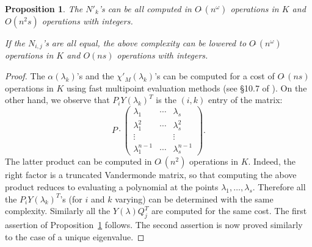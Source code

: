 \documentclass[sigconf]{acmart}
\newcommand{\softO}{O\tilde{~}}
\newtheorem{prop}[theo]{Proposition}
\theoremstyle{definition}
\begin{document}
\begin{prop}
\label{prop:opteigenvalues}
The $N'_k$'s can be all computed in $\softO(n^\omega)$ operations
in $K$ and $O(n^2 s)$ operations with integers.

If the $N_{i,j}$'s are all equal, the above complexity can be 
lowered to $\softO(n^\omega)$ operations in $K$ and $O(n s)$ operations 
with integers.
\end{prop}

\begin{proof}
The $\alpha(\lambda_k)$'s and the $\chi'_M(\lambda_k)$'s can be computed 
for a cost of $\softO(ns)$ operations in $K$ using fast multipoint 
evaluation methods (see \S 10.7 of \cite{gathen-gerhard:13a}).
On the other hand, we observe that $P_i Y(\lambda_k)^T$ is
the $(i,k)$ entry of the matrix:
$$P \cdot \left( \begin{matrix}
\lambda_1 & \cdots & \lambda_s \\
\lambda_1^2 & \cdots & \lambda_s^2 \\
\vdots & & \vdots \\
\lambda_1^{n-1} & \cdots & \lambda_s^{n-1}
\end{matrix} \right).$$
The latter product can be computed in $\softO(n^2)$ operations in 
$K$. Indeed,
the right factor is a truncated Vandermonde matrix, so that
computing the above product reduces to evaluating a polynomial at the
points $\lambda_1, \ldots, \lambda_s$. Therefore all the $P_i 
Y(\lambda_k)^T$'s (for $i$ and $k$ varying) 
can be determined with the same complexity. 
Similarly all the $Y(\lambda) Q_j^T$ are computed for the same cost.
The first assertion of Proposition~\ref{prop:opteigenvalues} follows.
The second assertion is now proved similarly to the case of a unique
eigenvalue.
\end{proof}




\end{document}
